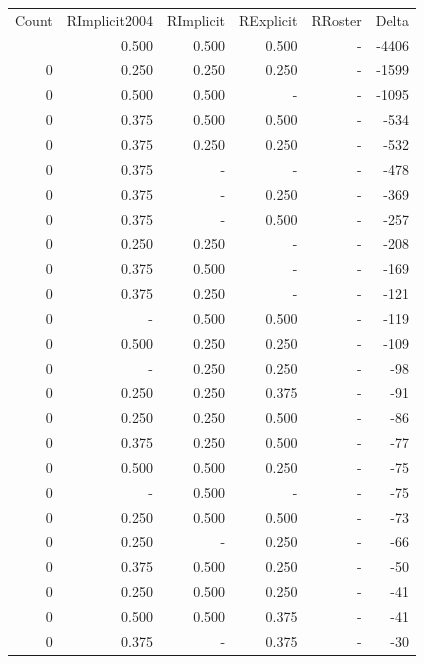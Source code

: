 \documentclass[a4paper]{article}\usepackage{graphicx, color}
\begin{document}
\begin{table}[ht]
\centering
\begin{tabular}{rrrrrr}
  \hline
Count & RImplicit2004 & RImplicit & RExplicit & RRoster & Delta \\ 
  \rowcolor{goodColor}  \hline
0 & 0.500 & 0.500 & 0.500 & - & -4406 \\ 
   \rowcolor{goodColor} 0 & 0.250 & 0.250 & 0.250 & - & -1599 \\ 
  0 & 0.500 & 0.500 & - & - & -1095 \\ 
   \rowcolor{goodColor} 0 & 0.375 & 0.500 & 0.500 & - & -534 \\ 
   \rowcolor{goodColor} 0 & 0.375 & 0.250 & 0.250 & - & -532 \\ 
   \rowcolor{nullColor} 0 & 0.375 & - & - & - & -478 \\ 
   \rowcolor{sosoColor} 0 & 0.375 & - & 0.250 & - & -369 \\ 
   \rowcolor{sosoColor} 0 & 0.375 & - & 0.500 & - & -257 \\ 
  0 & 0.250 & 0.250 & - & - & -208 \\ 
  0 & 0.375 & 0.500 & - & - & -169 \\ 
  0 & 0.375 & 0.250 & - & - & -121 \\ 
   \rowcolor{goodColor} 0 & - & 0.500 & 0.500 & - & -119 \\ 
   \rowcolor{goodColor} 0 & 0.500 & 0.250 & 0.250 & - & -109 \\ 
   \rowcolor{goodColor} 0 & - & 0.250 & 0.250 & - & -98 \\ 
  0 & 0.250 & 0.250 & 0.375 & - & -91 \\ 
   \rowcolor{badColor} 0 & 0.250 & 0.250 & 0.500 & - & -86 \\ 
   \rowcolor{badColor} 0 & 0.375 & 0.250 & 0.500 & - & -77 \\ 
   \rowcolor{badColor} 0 & 0.500 & 0.500 & 0.250 & - & -75 \\ 
  0 & - & 0.500 & - & - & -75 \\ 
   \rowcolor{goodColor} 0 & 0.250 & 0.500 & 0.500 & - & -73 \\ 
   \rowcolor{sosoColor} 0 & 0.250 & - & 0.250 & - & -66 \\ 
   \rowcolor{badColor} 0 & 0.375 & 0.500 & 0.250 & - & -50 \\ 
   \rowcolor{badColor} 0 & 0.250 & 0.500 & 0.250 & - & -41 \\ 
  0 & 0.500 & 0.500 & 0.375 & - & -41 \\ 
   \rowcolor{sosoColor} 0 & 0.375 & - & 0.375 & - & -30 \\ 

\end{tabular}
\end{table}
\end{document}
